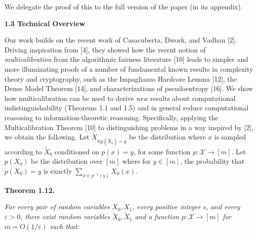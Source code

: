 


We delegate the proof of this to the full version of the paper (in its appendix).\par





\par\medskip\noindent\textbf{
1.3 Technical Overview}\par




Our work builds on the recent work of Casacuberta, Dwork, and Vadhan [2]. Driving inspiration from [4], they showed how the recent notion of \emph{multicalibration} from the algorithmic fairness literature [10] leads to simpler and more illuminating proofs of a number of fundamental known results in complexity theory and cryptography, such as the Impagliazzo Hardcore Lemma [12], the Dense Model Theorem [14], and characterizations of pseudoentropy [16]. We show how multicalibration can be used to derive \emph{new} results about computational indistinguishability (Theorems 1.1 and 1.5) and in general reduce computational reasoning to information-theoretic reasoning. Specifically, applying the Multicalibration Theorem [10] to distinguishing problems in a way inspired by [2], we obtain the following. Let $\widetilde{X}_{b|p(\widetilde{X}_{b})=y}$ be the distribution where $x$ is sampled according to $\widetilde{X}_{b}$ conditioned on $p(x)=y$, for some function $p:\mathcal{X}\to[m]$. Let $p(X_{0})$ be the distribution over $[m]$ where for $y\in[m]$, the probability that $p(X_{0})=y$ is exactly $\sum_{x\in p^{-1}(y)}X_{0}(x)$.\par





\par\medskip\noindent\textbf{
\textbf{Theorem 1.12}\textbf{.}
}\par



\emph{For every pair of random variables $X_{0},X_{1}$, every positive integer $s$, and every $\varepsilon>0$, there exist random variables $\widetilde{X}_{0},\widetilde{X}_{1}$ and a function $p:\mathcal{X}\to[m]$ for $m=O(1/\varepsilon)$ such that:}\par


